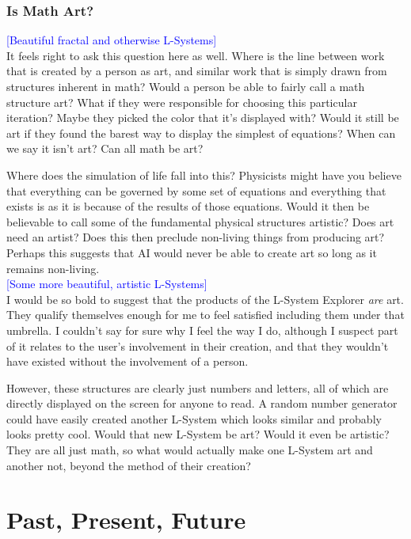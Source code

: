 \documentclass[12pt,twoside]{reedthesis}
\begin{document}
\subsection{Is Math Art?}

	\textcolor{blue}{[Beautiful fractal and otherwise L-Systems]}\\

	It feels right to ask this question here as well. Where is the line between work that is created by a person as art, and similar work that is simply drawn from structures inherent in math? Would a person be able to fairly call a math structure art? What if they were responsible for choosing this particular iteration? Maybe they picked the color that it's displayed with? Would it still be art if they found the barest way to display the simplest of equations? When can we say it isn't art? Can all math be art?
	
	Where does the simulation of life fall into this? Physicists might have you believe that everything can be governed by some set of equations and everything that exists is as it is because of the results of those equations. Would it then be believable to call some of the fundamental physical structures artistic? Does art need an artist? Does this then preclude non-living things from producing art? Perhaps this suggests that AI would never be able to create art so long as it remains non-living.\\
	
	\textcolor{blue}{[Some more beautiful, artistic L-Systems]}\\
	
	I would be so bold to suggest that the products of the L-System Explorer \textit{are} art. They qualify themselves enough for me to feel satisfied including them under that umbrella. I couldn't say for sure why I feel the way I do, although I suspect part of it relates to the user's involvement in their creation, and that they wouldn't have existed without the involvement of a person.
	
	However, these structures are clearly just numbers and letters, all of which are directly displayed on the screen for anyone to read. A random number generator could have easily created another L-System which looks similar and probably looks pretty cool. Would that new L-System be art? Would it even be artistic? They are all just math, so what would actually make one L-System art and another not, beyond the method of their creation?


\chapter{Past, Present, Future}
\end{document}
